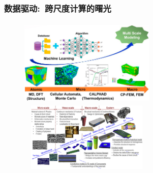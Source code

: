 \frame
{
	\frametitle{数据驱动:~跨尺度计算的曙光}
\begin{figure}[h!]
\vspace*{-0.15in}
\centering
\includegraphics[height=1.65in,width=2.55in,viewport=0 0 1179 721,clip]{Figures/Schematic_flow-of-multi_scale-modelling.png}
\includegraphics[height=1.30in,width=2.55in,viewport=0 0 224 125,clip]{Figures/Multiple_scales-Battery_cell.jpg}
\label{Data_for-Machine-Leaning}
\end{figure}
}

